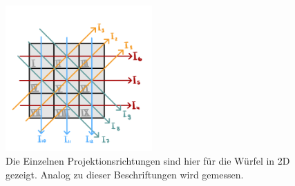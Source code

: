 \begin{figure}
    \centering
    \includegraphics[width=0.5\textwidth]{figures/richtungen.jpeg}
    \caption{Die Einzelnen Projektionsrichtungen sind hier für die Würfel in 2D gezeigt. Analog zu dieser Beschriftungen wird gemessen.} 
    \label{abb:richtungen}
\end{figure}